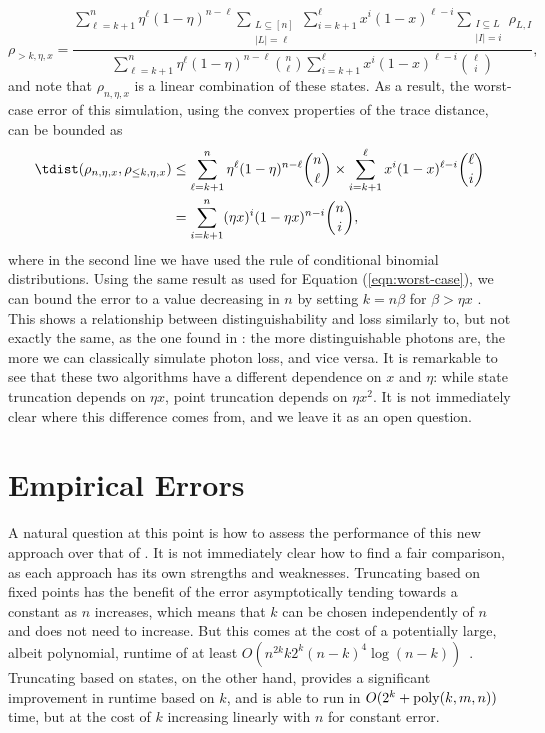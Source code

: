 \begin{equation}
\rho_{>k,\eta,x} = \frac{\sum_{\ell=k+1}^n\eta^\ell(1-\eta)^{n-\ell}\sum_{\substack{L\subseteq[n]\\|L|=\ell}}\sum_{i=k+1}^\ell x^i(1-x)^{\ell-i}\sum_{\substack{I\subseteq L\\|I|=i}}\rho_{L,I}}{\sum_{\ell=k+1}^n\eta^\ell(1-\eta)^{n-\ell}\binom{n}{\ell}\sum_{i=k+1}^\ell x^i(1-x)^{\ell-i}\binom{\ell}{i}},
\end{equation}
and note that $\rho_{n,\eta,x}$ is a linear combination of these states. 
As a result, the worst-case error of this simulation, using the convex properties of the trace distance, can be bounded as
\begin{align}
\tdist(\rho_{n,\eta,x},\rho_{\leq k,\eta,x}) &\leq \sum_{\ell=k+1}^n\eta^\ell(1-\eta)^{n-\ell}\binom{n}{\ell}\times\sum_{i=k+1}^\ell x^i(1-x)^{\ell-i}\binom{\ell}{i}\\
&=\sum_{i=k+1}^n(\eta x)^i(1-\eta x)^{n-i}\binom{n}{i}\label{eqn:lossy-worst},
\end{align}
where in the second line we have used the rule of conditional binomial distributions. 
Using the same result as used for Equation (\ref{eqn:worst-case}), we can bound the error to a value decreasing in $n$ by setting $k = n\beta$ for $\beta>\eta x$ \cite{arratia1989}. 
This shows a relationship between distinguishability and loss similarly to, but not exactly the same, as the one found in \cite{renema2018loss}: the more distinguishable photons are, the more we can classically simulate photon loss, and vice versa. It is remarkable to see that these two algorithms have a different dependence on $x$ and $\eta$: while state truncation depends on $\eta x$, point truncation depends on $\eta x^2$. It is not immediately clear where this difference comes from, and we leave it as an open question.



\section{Empirical Errors}
\label{sec:empirical-errors}

A natural question at this point is how to assess the performance of this new approach over that of \cite{renema2018,renema2018loss}. 
It is not immediately clear how to find a fair comparison, as each approach has its own strengths and weaknesses. 
Truncating based on fixed points has the benefit of the error asymptotically tending towards a constant as $n$ increases, which means that $k$ can be chosen independently of $n$ and does not need to increase. 
But this comes at the cost of a potentially large, albeit polynomial, runtime of at least $O(n^{2k}k2^k(n-k)^4\log(n-k))$~\cite{renema2018,huber2008}. 
Truncating based on states, on the other hand, provides a significant improvement in runtime based on $k$, and is able to run in $O(2^k + \operatorname{poly}(k,m,n))$ time, but at the cost of $k$ increasing linearly with $n$ for constant error.

